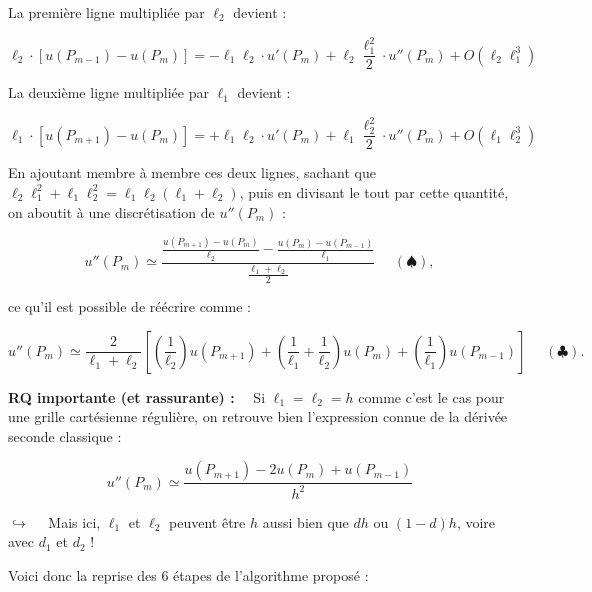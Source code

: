 \documentclass[12pt]{article}
\def \disp {\displaystyle}
\begin{document}
\vspace{5 mm}

\noindent
La première ligne multipliée par $\ell_2$ devient :

$$\ell_2 \cdot [u(P_{m-1}) - u(P_m)] = - \ell_1 \ell_2 \cdot u'(P_m) + \ell_2 \frac{\ell_1^2}{2} \cdot u''(P_m) + O(\ell_2 \ell_1^3)$$

\vspace{5 mm}

\noindent
La deuxième ligne multipliée par $\ell_1$ devient :

$$\ell_1 \cdot [u(P_{m+1}) - u(P_m)] = + \ell_1 \ell_2 \cdot u'(P_m) + \ell_1 \frac{\ell_2^2}{2} \cdot u''(P_m) + O(\ell_1 \ell_2^3)$$

\vspace{5 mm}

\noindent
En ajoutant membre à membre ces deux lignes, sachant que $\ell_2 \ell_1^2 + \ell_1 \ell_2^2 = \ell_1 \ell_2 (\ell_1 + \ell_2)$, puis en divisant le tout par cette quantité, on aboutit à une discrétisation de $u''(P_m)$ :

$$u''(P_m) \simeq \frac{\disp \frac{u(P_{m+1}) - u(P_m)}{\ell_2} - \frac{u(P_m) - u(P_{m-1})}{\ell_1} }{\disp \frac{\ell_1 + \ell_2}{2} }~~~~~~(\spadesuit),$$

\vspace{5 mm}

\noindent
ce qu'il est possible de réécrire comme :

$$u''(P_m) \simeq \frac{2}{\ell_1 + \ell_2} \left[ \left( \frac{1}{\ell_2} \right)u(P_{m+1}) + \left( \frac{1}{\ell_1} + \frac{1}{\ell_2} \right)u(P_{m}) + \left( \frac{1}{\ell_1} \right)u(P_{m-1}) \right]~~~~~~(\clubsuit).$$

\vspace{5 mm}

\noindent
\textbf{RQ importante (et rassurante) :}~~ Si $\ell_1 = \ell_2 = h$ comme c'est le cas pour une grille cartésienne régulière, on retrouve bien l'expression connue de la dérivée seconde classique :

$$u''(P_m) \simeq \frac{u(P_{m+1}) - 2u(P_m) + u(P_{m-1})}{h^2}$$

\vspace{5 mm}

\noindent
$\hookrightarrow$~~ Mais ici, $\ell_1$ et $\ell_2$ peuvent être $h$ aussi bien que $dh$ ou $(1-d)h$, voire avec $d_1$ et $d_2$ !

\vspace{5 mm}

\noindent
Voici donc la reprise des 6 étapes de l'algorithme proposé :
\end{document}
